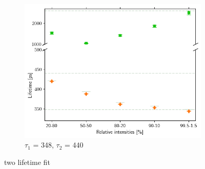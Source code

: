 \begin{figure}[p]
{        \begin{subfigure}{0.7\textwidth}
            \centering
            \includegraphics[width=0.95\linewidth]{Batch 7/348-440/output/2 life/lifetimes.png}
            \caption{$\tau_1$ = 348, $\tau_2$ = 440}
            \label{fig:2life_348}
        \end{subfigure}
    }
    \label{fig:2life}
    \caption{two lifetime fit} 
\end{figure}


